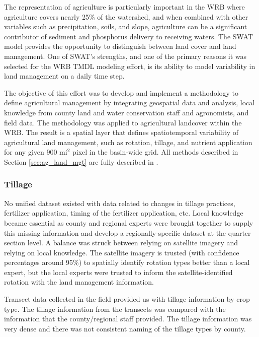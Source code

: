 
The representation of agriculture is particularly important in the WRB where agriculture covers nearly
25\% of the watershed, and when combined with other variables such as precipitation, soils,
and slope, agriculture can be a significant contributor of sediment and phosphorus delivery to receiving waters.  The SWAT model provides the opportunity to distinguish between land cover and land management.  One of SWAT’s strengths, and one of the primary reasons it was selected for the WRB TMDL modeling effort, is its ability to model variability in land management on a daily time step.

The objective of this effort was to develop and implement a methodology to define agricultural management by integrating geospatial data and analysis, local knowledge from county land and water conservation staff and agronomists, and field data. The methodology was applied to agricultural landcover within the WRB. The result is a spatial layer that defines spatiotemporal variability of agricultural land management, such as rotation, tillage, and nutrient application for any given 900 mi$^2$ pixel in the basin-wide grid. All methods described in Section \ref{sec:ag_land_mgt} are fully described in .

\subsubsection{Tillage}

No unified dataset existed with data related to changes in tillage practices, fertilizer application, timing of the fertilizer application, etc.  Local knowledge became essential as county and regional experts were brought together to supply this missing information and develop a regionally-specific dataset at the quarter section level. A balance was struck between relying on satellite imagery and relying on local knowledge. The satellite imagery is trusted (with confidence percentages around 95\%) to spatially identify rotation types better than a local expert, but the local experts were trusted to inform the satellite-identified rotation with the land management information.  

Transect data collected in the field provided us with tillage information by crop type. The tillage information from the transects was compared with the information that the county/regional staff provided. The tillage information was very dense and there was not consistent naming of the tillage types by county.

